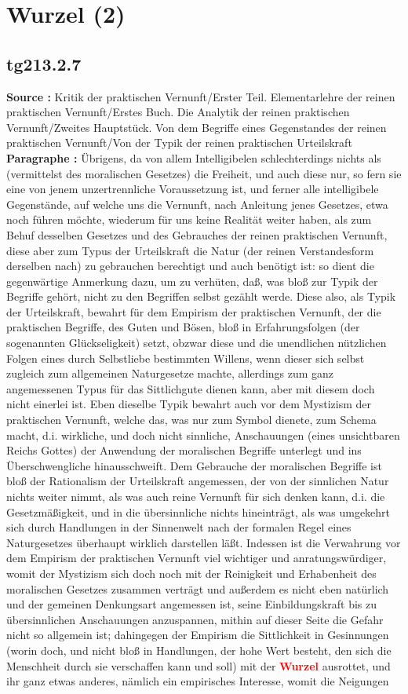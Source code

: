 \documentclass[a4paper,12pt,twoside]{book}
\newcommand{\match}[1]{\textcolor{red}{\textbf{#1}}}
\newcommand{\unnumberedsection}[1]{
	\section*{#1}
	\addcontentsline{toc}{section}{#1}
	\markright{#1}
}
\begin{document}
	\unnumberedsection{Wurzel (2)} 
	\subsection*{tg213.2.7} 
	\textbf{Source : }Kritik der praktischen Vernunft/Erster Teil. Elementarlehre der reinen praktischen Vernunft/Erstes Buch. Die Analytik der reinen praktischen Vernunft/Zweites Hauptstück. Von dem Begriffe eines Gegenstandes der reinen praktischen Vernunft/Von der Typik der reinen praktischen Urteilskraft\\  
	
	\noindent\textbf{Paragraphe : }Übrigens, da von allem Intelligibelen schlechterdings nichts als (vermittelst des moralischen Gesetzes) die Freiheit, und auch diese nur, so fern sie eine von jenem unzertrennliche Voraussetzung ist, und ferner alle intelligibele Gegenstände, auf welche uns die Vernunft, nach Anleitung  jenes Gesetzes, etwa noch führen möchte, wiederum für uns keine Realität weiter haben, als zum Behuf desselben Gesetzes und des Gebrauches der reinen praktischen Vernunft, diese aber zum Typus der Urteilskraft die Natur (der reinen Verstandesform derselben nach) zu gebrauchen berechtigt und auch benötigt ist: so dient die gegenwärtige Anmerkung dazu, um zu verhüten, daß, was bloß zur Typik der Begriffe gehört, nicht zu den Begriffen selbst gezählt werde. Diese also, als Typik der Urteilskraft, bewahrt für dem Empirism der praktischen Vernunft, der die praktischen Begriffe, des Guten und Bösen, bloß in Erfahrungsfolgen (der sogenannten Glückseligkeit) setzt, obzwar diese und die unendlichen nützlichen Folgen eines durch Selbstliebe bestimmten Willens, wenn dieser sich selbst zugleich zum allgemeinen Naturgesetze machte, allerdings zum ganz angemessenen Typus für das Sittlichgute dienen kann, aber mit diesem doch nicht einerlei ist. Eben dieselbe Typik bewahrt auch vor dem Mystizism der praktischen Vernunft, welche das, was nur zum Symbol dienete, zum Schema macht, d.i. wirkliche, und doch nicht sinnliche, Anschauungen (eines unsichtbaren Reichs Gottes) der Anwendung der moralischen Begriffe unterlegt und ins Überschwengliche hinausschweift. Dem Gebrauche der moralischen Begriffe ist bloß der Rationalism der Urteilskraft angemessen, der von der sinnlichen Natur nichts weiter nimmt, als was auch reine Vernunft für sich denken kann, d.i. die Gesetzmäßigkeit, und in die übersinnliche nichts hineinträgt, als was umgekehrt sich durch Handlungen in der Sinnenwelt nach der formalen Regel eines Naturgesetzes überhaupt wirklich darstellen läßt. Indessen ist die Verwahrung vor dem Empirism der praktischen Vernunft viel wichtiger und anratungswürdiger, womit der Mystizism sich doch noch mit der Reinigkeit und Erhabenheit des moralischen Gesetzes zusammen verträgt und außerdem es nicht eben natürlich und der gemeinen Denkungsart angemessen ist, seine Einbildungskraft bis zu übersinnlichen Anschauungen anzuspannen, mithin auf dieser Seite die Gefahr nicht so allgemein  ist; dahingegen der Empirism die Sittlichkeit in Gesinnungen (worin doch, und nicht bloß in Handlungen, der hohe Wert besteht, den sich die Menschheit durch sie verschaffen kann und soll) mit der \match{Wurzel} ausrottet, und ihr ganz etwas anderes, nämlich ein empirisches Interesse, womit die Neigungen 
\end{document}
